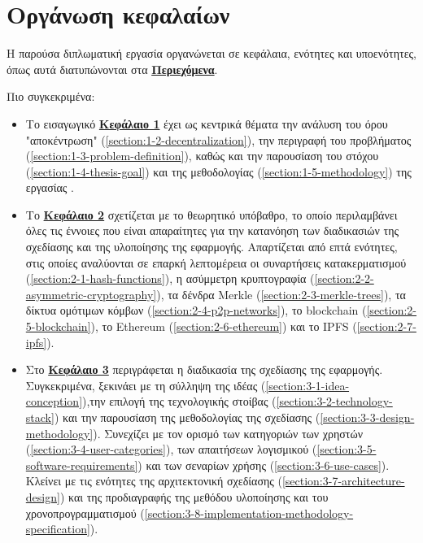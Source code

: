 \section{Οργάνωση κεφαλαίων}\label{section:1-7-document-structure}

Η παρούσα διπλωματική εργασία οργανώνεται σε κεφάλαια, ενότητες και υποενότητες, όπως αυτά διατυπώνονται στα \hyperref[toc]{\textbf{Περιεχόμενα}}.

Πιο συγκεκριμένα:

\begin{itemize}
	\item Το εισαγωγικό \hyperref[chapter:1-introduction]{\textbf{Κεφάλαιο 1}} έχει ως κεντρικά θέματα την ανάλυση του όρου "αποκέντρωση" (\ref{section:1-2-decentralization}), την περιγραφή του προβλήματος (\ref{section:1-3-problem-definition}), καθώς και την παρουσίαση του στόχου (\ref{section:1-4-thesis-goal}) και της μεθοδολογίας (\ref{section:1-5-methodology}) της εργασίας .
	\item Το \hyperref[chapter:2-theoretical-background]{\textbf{Κεφάλαιο 2}} σχετίζεται με το θεωρητικό υπόβαθρο, το οποίο περιλαμβάνει όλες τις έννοιες που είναι απαραίτητες για την κατανόηση των διαδικασιών της σχεδίασης και της υλοποίησης της εφαρμογής. Απαρτίζεται από επτά ενότητες, στις οποίες αναλύονται σε επαρκή λεπτομέρεια οι συναρτήσεις κατακερματισμού (\ref{section:2-1-hash-functions}), η ασύμμετρη κρυπτογραφία (\ref{section:2-2-asymmetric-cryptography}), τα δένδρα Merkle (\ref{section:2-3-merkle-trees}), τα δίκτυα ομότιμων κόμβων (\ref{section:2-4-p2p-networks}), το blockchain (\ref{section:2-5-blockchain}), το Ethereum (\ref{section:2-6-ethereum}) και το IPFS (\ref{section:2-7-ipfs}).
	\item Στο \hyperref[chapter:3-application-design]{\textbf{Κεφάλαιο 3}} περιγράφεται η διαδικασία της σχεδίασης της εφαρμογής. Συγκεκριμένα, ξεκινάει με τη σύλληψη της ιδέας (\ref{section:3-1-idea-conception}),την επιλογή της τεχνολογικής στοίβας (\ref{section:3-2-technology-stack}) και την παρουσίαση της μεθοδολογίας της σχεδίασης (\ref{section:3-3-design-methodology}). Συνεχίζει με τον ορισμό των κατηγοριών των χρηστών (\ref{section:3-4-user-categories}), των απαιτήσεων λογισμικού (\ref{section:3-5-software-requirements}) και των σεναρίων χρήσης (\ref{section:3-6-use-cases}). Κλείνει με τις ενότητες της αρχιτεκτονική σχεδίασης (\ref{section:3-7-architecture-design}) και της
	προδιαγραφής της μεθόδου υλοποίησης και του χρονοπρογραμματισμού (\ref{section:3-8-implementation-methodology-specification}).

\end{itemize}
